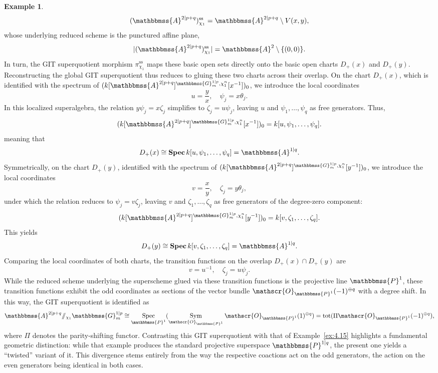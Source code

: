 \documentclass[11pt,a4paper,reqno,noamsfonts]{amsart}
\numberwithin{equation}{section}
\theoremstyle{definition}
\newtheorem{example}[theorem]{Example}
\theoremstyle{remark}
\renewcommand{\AA}{\ensuremath{\mathbbmss{A}}}
\newcommand{\GG}{\ensuremath{\mathbbmss{G}}}
\newcommand{\PP}{\ensuremath{\mathbbmss{P}}}
\newcommand{\Ocal}{\ensuremath{\mathscr{O}}}
\newcommand{\uss}{\ensuremath{\mathrm{ss}}}
\DeclareMathOperator{\Spec}{Spec}
\DeclareMathOperator{\sSpec}{\mathbf{Spec}}
\DeclareMathOperator{\Sym}{Sym}
\DeclareMathOperator{\tot}{tot}
\begin{document}
\begin{example}
$$ 
(\AA^{2 \vert p+q})^{\uss}_{\chi_1} = \AA^{2 \vert p+q} \setminus V(x,y), 
$$
whose underlying reduced scheme is the punctured affine plane,
$$
\lvert (\AA^{2 \vert p+q})^{\uss}_{\chi_1} \rvert = \AA^{2} \setminus \{(0,0)\}.
$$
In turn, the GIT superquotient morphism $\pi^{\uss}_{\chi_1}$ maps these basic open sets directly onto the basic open charts $D_+(x)$ and $D_+(y)$. Reconstructing the global GIT superquotient thus reduces to gluing these two charts across their overlap. On the chart $D_+(x)$, which is identified with the spectrum of $(k[\AA^{2 \vert p+q}]^{\GG_m^{1 \vert p}, \chi_1^n}[x^{-1}])_0$, we introduce the local coordinates
$$
u = \frac{y}{x}, \quad \psi_j = x \theta_j.
$$
In this localized superalgebra, the relation $y \psi_j = x \zeta_j$ simplifies to $\zeta_j = u \psi_j$, leaving $u$ and $\psi_1,\dots,\psi_q$ as free generators. Thus,
$$
(k[\AA^{2 \vert p+q}]^{\GG_m^{1 \vert p}, \chi_1^n}[x^{-1}])_0 = k[u,\psi_1,\dots,\psi_q]. 
$$
meaning that
$$
D_+(x) \cong \sSpec k[u,\psi_1,\dots,\psi_q] = \AA^{1 \vert q}. 
$$
Symmetrically, on the chart $D_+(y)$, identified with the spectrum of $(k[\AA^{2 \vert p+q}]^{\GG_m^{1 \vert p}, \chi_1^n}[y^{-1}])_0$, we introduce the local coordinates
$$
v = \frac{x}{y}, \quad \zeta_j = y \theta_j,
$$
under which the relation reduces to $\psi_j = v \zeta_j$, leaving $v$ and $\zeta_1,\dots,\zeta_q$ as free generators of the degree-zero component:
$$
(k[\AA^{2 \vert p+q}]^{\GG_m^{1 \vert p}, \chi_1^n}[y^{-1}])_0 = k[v,\zeta_1,\dots,\zeta_q]. 
$$
This yields
$$
D_+(y) \cong \sSpec k[v,\zeta_1,\dots,\zeta_q] = \AA^{1 \vert q}.
$$
Comparing the local coordinates of both charts, the transition functions on the overlap $D_+(x) \cap D_+(y)$ are
$$
v = u^{-1},\quad \zeta_j = u \psi_j.
$$
While the reduced scheme underlying the superscheme glued via these transition functions is the projective line $\PP^1$, these transition functions exhibit the odd coordinates as sections of the vector bundle $\Ocal_{\PP^1}(-1)^{\oplus q}$ with a degree shift. In this way, the GIT superquotient is identified as
$$
\AA^{2 \vert p+q} {\sslash_{\chi_1}} \GG_m^{1 \vert p}  \cong \Spec_{\PP^1} (\Sym_{\Ocal_{\PP^1}} \Ocal_{\PP^1}(1)^{\oplus q}) =  \tot (\Pi \Ocal_{\PP^1}(-1)^{\oplus q}),
$$
where $\Pi$ denotes the parity-shifting functor. Contrasting this GIT superquotient with that of Example~\ref{ex:4.15} highlights a fundamental geometric distinction: while that example produces the standard projective superspace $\PP^{1\vert q}$, the present one yields a ``twisted'' variant of it. This divergence stems entirely from the way the respective coactions act on the odd generators, the action on the even generators being identical in both cases.
\end{example}
\end{document}
